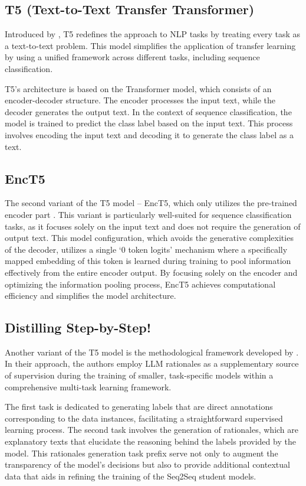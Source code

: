 \subsection{T5 (Text-to-Text Transfer Transformer)}

Introduced by \citeauthor{t5} \cite{t5}, T5 redefines the approach to NLP tasks by treating every task as a text-to-text problem. This model simplifies the application of transfer learning by using a unified framework across different tasks, including sequence classification.

T5's architecture is based on the Transformer model, which consists of an encoder-decoder structure. The encoder processes the input text, while the decoder generates the output text. In the context of sequence classification, the model is trained to predict the class label based on the input text. This process involves encoding the input text and decoding it to generate the class label as a text.

\subsection{EncT5}

The second variant of the T5 model -- EncT5, which only utilizes the pre-trained encoder part \cite{enct5}. This variant is particularly well-suited for sequence classification tasks, as it focuses solely on the input text and does not require the generation of output text. This model configuration, which avoids the generative complexities of the decoder, utilizes a single `0 token logits' mechanism where a specifically mapped embedding of this token is learned during training to pool information effectively from the entire encoder output. By focusing solely on the encoder and optimizing the information pooling process, EncT5 achieves computational efficiency and simplifies the model architecture.

\subsection{Distilling Step-by-Step!}

Another variant of the T5 model is the methodological framework developed by \citeauthor{stepbystep} \cite{stepbystep}. In their approach, the authors employ LLM rationales as a supplementary source of supervision during the training of smaller, task-specific models within a comprehensive multi-task learning framework.

The first task is dedicated to generating labels that are direct annotations corresponding to the data instances, facilitating a straightforward supervised learning process. The second task involves the generation of rationales, which are explanatory texts that elucidate the reasoning behind the labels provided by the model. This rationales generation task prefix serve not only to augment the transparency of the model’s decisions but also to provide additional contextual data that aids in refining the training of the Seq2Seq student models.

